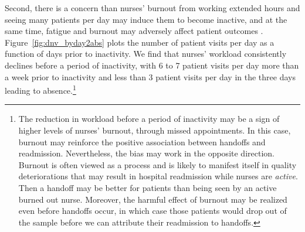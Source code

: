 \documentclass[final,12pt, notitlepage]{article}
\begin{document}
Second, there is a concern than nurses' burnout from working extended hours and seeing many patients per day may induce them to become inactive, and at the same time, fatigue and burnout may adversely affect patient outcomes \citep{Aiken2002}. Figure~\ref{fig:dnv_byday2abs} plots the number of patient visits per day as a function of days prior to inactivity. We find that nurses' workload consistently declines before a period of inactivity, with 6 to 7 patient visits per day more than a week prior to inactivity and less than 3 patient visits per day in the three days leading to absence.\footnote{The reduction in workload before a period of inactivity may be a sign of higher levels of nurses' burnout, through missed appointments. In this case, burnout may reinforce the positive association between handoffs and readmission. Nevertheless, the bias may work in the opposite direction. Burnout is often viewed as a process and is likely to manifest itself in quality deteriorations that may result in hospital readmission while nurses are \textit{active}. Then a handoff may be better for patients than being seen by an active burned out nurse. Moreover, the harmful effect of burnout may be realized even before handoffs occur, in which case those patients would drop out of the sample before we can attribute their readmission to handoffs.}
%
\end{document}
